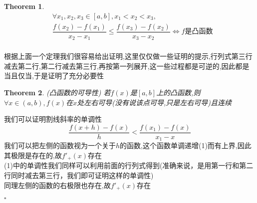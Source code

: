 \documentclass[11pt,hyperref,a4paper,UTF8]{ctexart}
\newtheorem{theorem}{Theorem}[subsection]
\newenvironment{cproof}{%
\heiti{证明}\kaishu
}{%
  \hfill $\square$
  \par\bigskip
}
\begin{document}
\begin{CJK}{UTF8}{gkai}
\begin{center}
  \end{center}
\begin{theorem}
\[
\begin{aligned}    
&\forall x_1,x_2,x_3 \in [a,b],x_1<x_2 < x_3,\\
&\dfrac{f(x_2)-f(x_1)}{x_2-x_1}\leq\dfrac{f(x_3)-f(x_2)}{x_3-x_2} \Leftrightarrow f\text{是凸函数}\\
\end{aligned}
\]
\end{theorem}
根据上面一个定理我们很容易给出证明,这里仅仅做一些证明的提示,行列式第三行减去第二行,第二行减去第三行,再按第一列展开,这一些过程都是可逆的,因此都是当且仅当,于是证明了充分必要性\\

\begin{theorem}(凸函数的可导性)
若$f(x)$是$[a,b]$上的凸函数,则$\forall x\in (a,b),f(x)$在$x$处左右可导(没有说该点可导,只是左右可导)且连续\\
\end{theorem}
\begin{cproof}
我们可以证明割线斜率的单调性
\[\dfrac{f(x+h) - f(x)}{h} < \dfrac{f(x_1) - f(x)}{x_1 - x}\]
我们可以把左侧的函数视为一个关于$h$的函数,这个函数单调递增(1)而有上界,因此其极限是存在的,故$f'_+(x)$存在\\

(1)中的单调性我们同样可以利用前面的行列式得到(准确来说，是用第一行和第二行同时减去第三行，我们即可证明这样的单调性)\\

同理左侧的函数的右极限也存在,故$f'_+(x)$存在\\

\begin{center}
\end{center}
\end{cproof}
\end{CJK}
\end{document}
